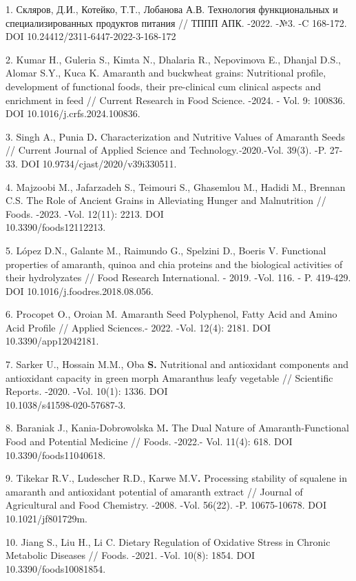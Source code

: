 \begin{references}
1. Скляров, Д.И., Котейко, Т.Т., Лобанова А.В. Технология функциональных
и специализированных продуктов питания // ТППП АПК. -2022. -№3. -C
168-172. DOI 10.24412/2311-6447-2022-3-168-172

2. Kumar H., Guleria S., Kimta N., Dhalaria R., Nepovimova E., Dhanjal
D.S., Alomar S.Y., Kuca K. Amaranth and buckwheat grains: Nutritional
profile, development of functional foods, their pre-clinical cum
clinical aspects and enrichment in feed // Current Research in Food
Science. -2024. - Vol. 9: 100836. DOI 10.1016/j.crfs.2024.100836.

3. Singh A., Punia D{\bfseries .} Characterization and Nutritive Values of
Amaranth Seeds // Current Journal of Applied Science and
Technology.\emph{-}2020.-Vol. 39(3). -P. 27-33.
DOI 10.9734/cjast/2020/v39i330511.

4. Majzoobi M., Jafarzadeh S., Teimouri S., Ghasemlou M., Hadidi M.,
Brennan C.S. The Role of Ancient Grains in Alleviating Hunger and
Malnutrition // Foods. -2023. -Vol. 12(11): 2213.
DOI \\10.3390/foods12112213.

5. López D.N., Galante M., Raimundo G., Spelzini D., Boeris V. Functional
properties of amaranth, quinoa and chia proteins and the biological
activities of their hydrolyzates // Food Research International. - 2019.
-Vol. 116. - P. 419-429. DOI 10.1016/j.foodres.2018.08.056.

6. Procopet O., Oroian M. Amaranth Seed Polyphenol, Fatty Acid and Amino
Acid Profile // Applied Sciences.- 2022. -Vol. 12(4): 2181. DOI
10.3390/app12042181.

7. Sarker U., Hossain M.M., Oba {\bfseries S.} Nutritional and antioxidant
components and antioxidant capacity in green morph Amaranthus leafy
vegetable // Scientific Reports\emph{.} -2020. -Vol. 10(1): 1336. DOI\\
10.1038/s41598-020-57687-3.

8. Baraniak J., Kania-Dobrowolska M{\bfseries .} The Dual Nature of
Amaranth-Functional Food and Potential Medicine // Foods. -2022.- Vol.
11(4): 618. DOI 10.3390/foods11040618.

9. Tikekar R.V., Ludescher R.D., Karwe M.V{\bfseries .} Processing stability
of squalene in amaranth and antioxidant potential of amaranth extract //
Journal of Agricultural and Food Chemistry. -2008. -Vol. 56(22). -P.
10675-10678. DOI 10.1021/jf801729m.

10. Jiang S., Liu H., Li C. Dietary Regulation of Oxidative Stress in
Chronic Metabolic Diseases // Foods. -2021. -Vol. 10(8): 1854. DOI
10.3390/foods10081854.


\end{references}
